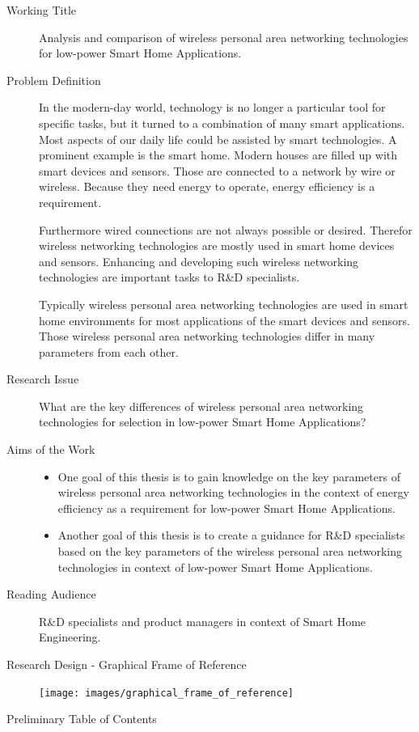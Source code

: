 \documentclass[a4paper]{scrartcl}
\begin{document}
\begin{description}

\item[Working Title] \hfill \break
Analysis and comparison of wireless personal area networking technologies for low-power Smart Home Applications.

\item[Problem Definition] \hfill \break
In the modern-day world, technology is no longer a particular tool for specific tasks, but it turned to a combination of many smart applications. Most aspects of our daily life could be assisted by smart technologies. A prominent example is the smart home. Modern houses are filled up with smart devices and sensors. Those are connected to a network by wire or wireless. Because they need energy to operate, energy efficiency is a requirement.\par
Furthermore wired connections are not always possible or desired. Therefor wireless networking technologies are mostly used in smart home devices and sensors. Enhancing and developing such wireless networking technologies are important tasks to R\&D specialists.\par
Typically wireless personal area networking technologies are used in smart home environments for most applications of the smart devices and sensors. Those wireless personal area networking technologies differ in many parameters from each other.

\item[Research Issue] \hfill \break
What are the key differences of wireless personal area networking technologies for selection in low-power Smart Home Applications?

\item[Aims of the Work] \hfill
\begin{itemize}
\item One goal of this thesis is to gain knowledge on the key parameters of wireless personal area networking technologies in the context of energy efficiency as a requirement for low-power Smart Home Applications.
\item Another goal of this thesis is to create a guidance for R\&D specialists based on the key parameters of the wireless personal area networking technologies in context of low-power Smart Home Applications.
\end{itemize}

\item[Reading Audience] \hfill \break
R\&D specialists and product managers in context of Smart Home Engineering.

\newpage
\item[Research Design - Graphical Frame of Reference] \hfill \break
\texttt{[image: images/graphical\_frame\_of\_reference]}

\newpage
\item[Preliminary Table of Contents] \hfill \break
\par


\newpage
\nocite{*}
\printbibliography

\end{description}
\end{document}
